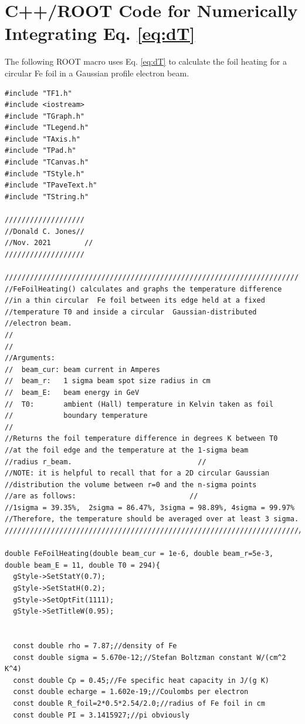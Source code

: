 \documentclass[12pt]{article}
\begin{document}
\section{C++/ROOT Code for Numerically Integrating Eq. \ref{eq:dT}}
The following ROOT macro uses Eq. \ref{eq:dT} to calculate the foil heating for a circular Fe foil in a Gaussian profile electron beam.
\begin{lstlisting}
#include "TF1.h"
#include <iostream>
#include "TGraph.h"
#include "TLegend.h"
#include "TAxis.h"
#include "TPad.h"
#include "TCanvas.h"
#include "TStyle.h"
#include "TPaveText.h"
#include "TString.h"

///////////////////
//Donald C. Jones//
//Nov. 2021        //
///////////////////

//////////////////////////////////////////////////////////////////////
//FeFoilHeating() calculates and graphs the temperature difference 
//in a thin circular  Fe foil between its edge held at a fixed 
//temperature T0 and inside a circular  Gaussian-distributed 
//electron beam.                                                 
//     
//                                                                               
//Arguments:                                                                         
//  beam_cur: beam current in Amperes                                                
//  beam_r:   1 sigma beam spot size radius in cm                                    
//  beam_E:   beam energy in GeV                                                      
//  T0:       ambient (Hall) temperature in Kelvin taken as foil 
//            boundary temperature 
//                                                                              
//Returns the foil temperature difference in degrees K between T0
//at the foil edge and the temperature at the 1-sigma beam 
//radius r_beam.                              //
//NOTE: it is helpful to recall that for a 2D circular Gaussian 
//distribution the volume between r=0 and the n-sigma points 
//are as follows:                           //
//1sigma = 39.35%,  2sigma = 86.47%, 3sigma = 98.89%, 4sigma = 99.97%
//Therefore, the temperature should be averaged over at least 3 sigma.    
/////////////////////////////////////////////////////////////////////////

double FeFoilHeating(double beam_cur = 1e-6, double beam_r=5e-3, double beam_E = 11, double T0 = 294){
  gStyle->SetStatY(0.7);
  gStyle->SetStatH(0.2);
  gStyle->SetOptFit(1111);
  gStyle->SetTitleW(0.95);


  const double rho = 7.87;//density of Fe
  const double sigma = 5.670e-12;//Stefan Boltzman constant W/(cm^2 K^4)
  const double Cp = 0.45;//Fe specific heat capacity in J/(g K)
  const double echarge = 1.602e-19;//Coulombs per electron
  const double R_foil=2*0.5*2.54/2.0;//radius of Fe foil in cm
  const double PI = 3.1415927;//pi obviously


\end{lstlisting}
\end{document}
